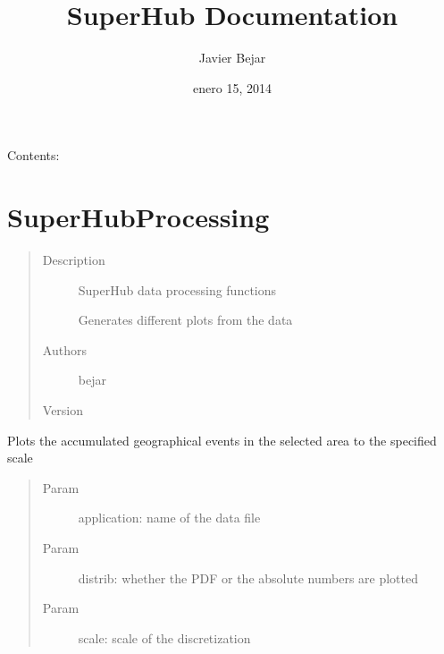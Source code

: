 \documentclass[letterpaper,10pt,english]{sphinxmanual}
\title{SuperHub Documentation}
\date{enero 15, 2014}
\author{Javier Bejar}
\begin{document}
\maketitle
\tableofcontents
{}\label{index::doc}


Contents:
\label{index:module-SuperHubProcessing}\label{index:module-SuperHubProcessing}

\chapter{SuperHubProcessing}
\label{index:superhubprocessing}\label{index:welcome-to-superhub-s-documentation}\begin{quote}\begin{description}
\item[{Description}] \leavevmode
SuperHub data processing functions

Generates different plots from the data

\item[{Authors}] \leavevmode
bejar

\item[{Version}] 

\end{description}\end{quote}

\begin{fulllineitems}
\label{index:SuperHubProcessing.accumulatedEvents}
Plots the accumulated geographical events in the selected area to the
specified scale
\begin{quote}\begin{description}
\item[{Param }] \leavevmode
application: name of the data file

\item[{Param }] \leavevmode
distrib: whether the PDF or the absolute numbers are plotted

\item[{Param }] \leavevmode
scale: scale of the discretization

\end{description}\end{quote}

\end{fulllineitems}
\end{document}
